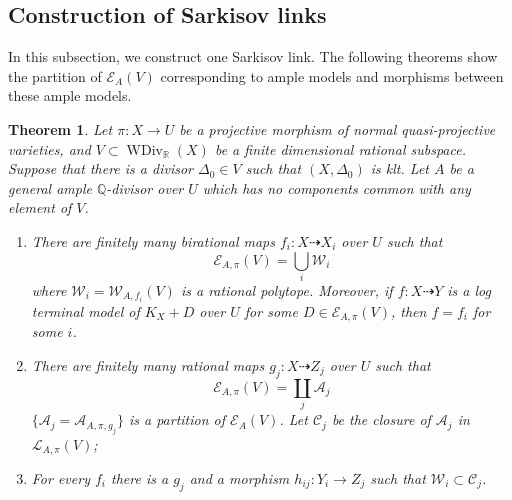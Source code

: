 \documentclass[11pt]{amsart}
\newtheorem{thm}[defn]{Theorem}
\begin{document}
\subsection{Construction of Sarkisov links}
In this subsection, we construct one Sarkisov link. The following theorems show the partition of $\mathcal{E}_{A}(V)$  corresponding to ample models and morphisms between these ample models.
\begin{thm}\label{finitemodel}
  \cite[Corollary 1.1.5]{BCHM10} Let $\pi:X\to U$ be a projective morphism of normal quasi-projective varieties,  and $V \subset \operatorname{WDiv}_{\mathbb{R}}(X)$ be a finite dimensional rational subspace. Suppose that there is a divisor $\Delta_{0} \in V$ such that $(X,\Delta_{0})$ is klt. Let $A$ be a general ample $\mathbb{Q}$-divisor over $U$ which has no components common with any element of $V$.
  \begin{enumerate}
    \item   There are finitely many birational maps $f_{i}:X \dashrightarrow   X_{i}$ over $U$ such that
          \[
            \mathcal{E}_{A,\pi}(V) =\bigcup_{i}\mathcal{W}_{i}
          \]
          where  $\mathcal{W}_{i}=\mathcal{W}_{A,f_{i}}(V)$ is a rational polytope. Moreover, if  $f:X \dashrightarrow  Y$ is a  log terminal model of $K_{X}+D$ over $U$ for some $D \in \mathcal{E}_{A,\pi}(V)$, then  $f=f_{i}$ for some $i$.

    \item   There are finitely many rational maps $g_{j}:X \dashrightarrow  Z_{j}$ over $U$ such that
          \[
            \mathcal{E}_{A,\pi}(V) =\coprod_{j}\mathcal{A}_{j}
          \]
          $ \{\mathcal{A}_j=\mathcal{A}_{A,\pi,g_j}\} $ is a partition of $ \mathcal{E}_{A}(V) $. Let $\mathcal{C}_{j}$ be the closure of $\mathcal{A}_{j}$ in $\mathcal{L}_{A,\pi}(V)$;
    \item  For every  $f_{i}$ there is a $g_{j}$ and a morphism $h_{ij}:Y_{i}\to Z_{j}$ such that $\mathcal{W}_{i} \subset \mathcal{C}_{j}$.
  \end{enumerate}
\end{thm}
\end{document}
